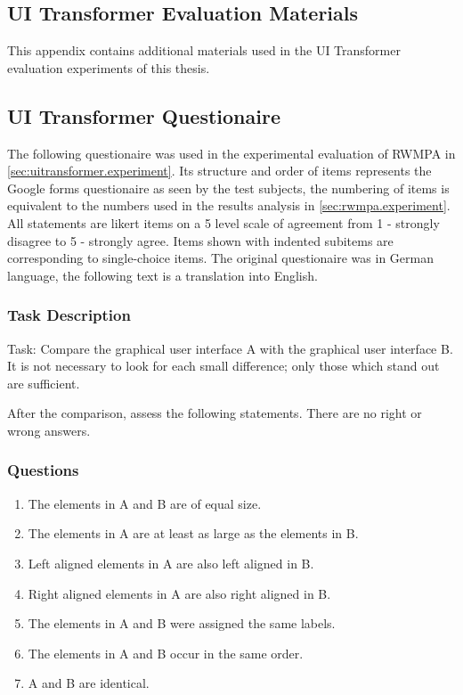 \begin{appendix}
\chapter{UI Transformer Evaluation Materials}
This appendix contains additional materials used in the UI Transformer evaluation experiments of this thesis.
\vspace{-15pt}
\section{UI Transformer Questionaire\label{sec:uitransformer-questionaire}}
\vspace{15pt}

The following questionaire was used in the experimental evaluation of RWMPA in \cref{sec:uitransformer.experiment}. 
Its structure and order of items represents the Google forms questionaire as seen by the test subjects, the numbering of items is equivalent to the numbers used in the results analysis in \cref{sec:rwmpa.experiment}. 
All statements are likert items on a 5 level scale of agreement from 1 - strongly disagree to 5 - strongly agree. 
Items shown with indented subitems are corresponding to single-choice items.
The original questionaire was in German language, the following text is a translation into English.

\subsection*{Task Description}

Task: Compare the graphical user interface A with the graphical user interface B.
It is not necessary to look for each small difference; only those which stand out are sufficient.

After the comparison, assess the following statements.
There are no right or wrong answers.

\subsection*{Questions}
\begin{enumerate}[start=1,label={\bfseries Q\arabic*}]
\item The elements in A and B are of equal size.
\item The elements in A are at least as large as the elements in B.
\item Left aligned elements in A are also left aligned in B.
\item Right aligned elements in A are also right aligned in B.
\item The elements in A and B were assigned the same labels.
\item The elements in A and B occur in the same order.
\item A and B are identical.
\end{enumerate}


\end{appendix}
